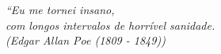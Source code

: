 \begin{epigrafe}
    \vspace*{\fill}
    \begin{flushright}
        \textit{``Eu me tornei insano, \\
        com longos intervalos de horrível sanidade.\\
        (Edgar Allan Poe (1809 - 1849))}
    \end{flushright}
\end{epigrafe}
